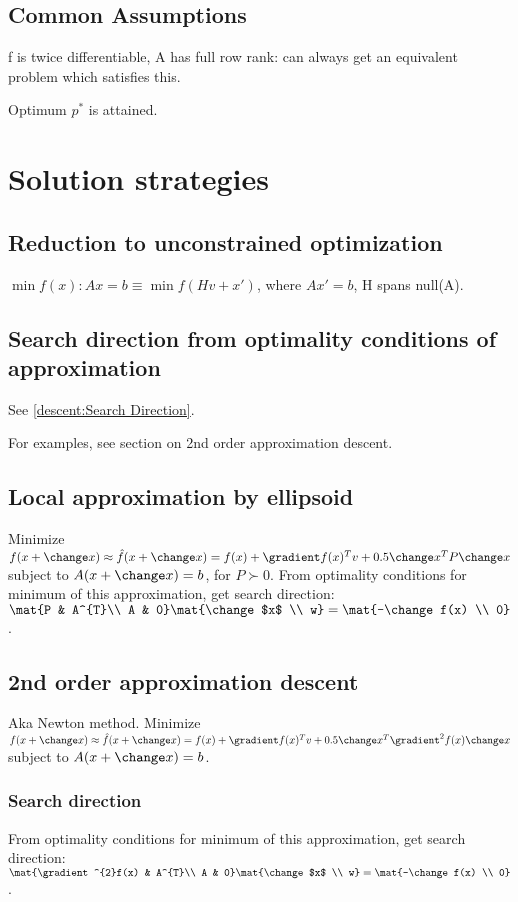 \documentclass[oneside, article]{memoir}
\begin{document}
\subsection{Common Assumptions}
f is twice differentiable, A has full row rank: can always get an equivalent problem which satisfies this.

Optimum $p^*$ is attained.

\section{Solution strategies}
\subsection{Reduction to unconstrained optimization}
$\min f(x): Ax = b \equiv \min f(Hv + x')$, where $Ax' = b$, H spans null(A).

\subsection{Search direction from optimality conditions of approximation}
See \ref{descent:Search Direction}.

For examples, see section on 2nd order approximation descent.

\subsection{Local approximation by ellipsoid}
Minimize $f(x + \change x) \approx \hat{f}(x + \change x) = f(x) + \gradient f(x)^{T}v + 0.5 \change x^{T} P\change x$ subject to $A(x + \change x)= b$, for $P \succ 0$. From optimality conditions for minimum of this approximation, get search direction: $\mat{P & A^{T}\\ A & 0} \mat{\change $x$ \\ w} = \mat{-\change f(x) \\ 0}$.

\subsection{2nd order approximation descent}
Aka Newton method. Minimize $f(x + \change x) \approx \hat{f}(x + \change x) = f(x) + \gradient f(x)^{T}v + 0.5 \change x^{T} \gradient^{2}f(x) \change x$ subject to $A(x + \change x)= b$. 

\subsubsection{Search direction}
From optimality conditions for minimum of this approximation, get search direction: $\mat{\gradient^{2}f(x) & A^{T}\\ A & 0} \mat{\change $x$ \\ w} = \mat{-\change f(x) \\ 0}$.
\end{document}

